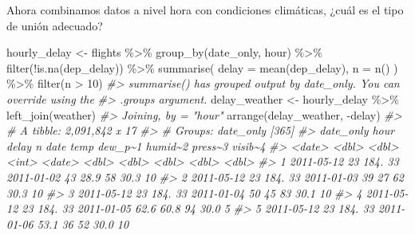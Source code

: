 \documentclass[
]{book}
\newenvironment{Shaded}{\begin{snugshade}}{\end{snugshade}}
\newcommand{\AttributeTok}[1]{\textcolor[rgb]{0.77,0.63,0.00}{#1}}
\newcommand{\CommentTok}[1]{\textcolor[rgb]{0.56,0.35,0.01}{\textit{#1}}}
\newcommand{\DecValTok}[1]{\textcolor[rgb]{0.00,0.00,0.81}{#1}}
\newcommand{\FunctionTok}[1]{\textcolor[rgb]{0.00,0.00,0.00}{#1}}
\newcommand{\NormalTok}[1]{#1}
\newcommand{\OtherTok}[1]{\textcolor[rgb]{0.56,0.35,0.01}{#1}}
\newcommand{\SpecialCharTok}[1]{\textcolor[rgb]{0.00,0.00,0.00}{#1}}
\begin{document}
Ahora combinamos datos a nivel hora con condiciones climáticas, ¿cuál es el tipo
de unión adecuado?

\begin{Shaded}
\begin{Highlighting}[]
\NormalTok{hourly\_delay }\OtherTok{\textless{}{-}}\NormalTok{ flights }\SpecialCharTok{\%\textgreater{}\%}
  \FunctionTok{group\_by}\NormalTok{(date\_only, hour) }\SpecialCharTok{\%\textgreater{}\%}
  \FunctionTok{filter}\NormalTok{(}\SpecialCharTok{!}\FunctionTok{is.na}\NormalTok{(dep\_delay)) }\SpecialCharTok{\%\textgreater{}\%}
  \FunctionTok{summarise}\NormalTok{(}
    \AttributeTok{delay =} \FunctionTok{mean}\NormalTok{(dep\_delay),}
    \AttributeTok{n =} \FunctionTok{n}\NormalTok{() ) }\SpecialCharTok{\%\textgreater{}\%}
  \FunctionTok{filter}\NormalTok{(n }\SpecialCharTok{\textgreater{}} \DecValTok{10}\NormalTok{)}
\CommentTok{\#\textgreater{} \textasciigrave{}summarise()\textasciigrave{} has grouped output by \textquotesingle{}date\_only\textquotesingle{}. You can override using the}
\CommentTok{\#\textgreater{} \textasciigrave{}.groups\textasciigrave{} argument.}
\NormalTok{delay\_weather }\OtherTok{\textless{}{-}}\NormalTok{ hourly\_delay }\SpecialCharTok{\%\textgreater{}\%} \FunctionTok{left\_join}\NormalTok{(weather)}
\CommentTok{\#\textgreater{} Joining, by = "hour"}
\FunctionTok{arrange}\NormalTok{(delay\_weather, }\SpecialCharTok{{-}}\NormalTok{delay)}
\CommentTok{\#\textgreater{} \# A tibble: 2,091,842 x 17}
\CommentTok{\#\textgreater{} \# Groups:   date\_only [365]}
\CommentTok{\#\textgreater{}    date\_only   hour delay     n date        temp dew\_p\textasciitilde{}1 humid\textasciitilde{}2 press\textasciitilde{}3 visib\textasciitilde{}4}
\CommentTok{\#\textgreater{}    \textless{}date\textgreater{}     \textless{}dbl\textgreater{} \textless{}dbl\textgreater{} \textless{}int\textgreater{} \textless{}date\textgreater{}     \textless{}dbl\textgreater{}   \textless{}dbl\textgreater{}   \textless{}dbl\textgreater{}   \textless{}dbl\textgreater{}   \textless{}dbl\textgreater{}}
\CommentTok{\#\textgreater{}  1 2011{-}05{-}12    23  184.    33 2011{-}01{-}02  43      28.9      58    30.3      10}
\CommentTok{\#\textgreater{}  2 2011{-}05{-}12    23  184.    33 2011{-}01{-}03  39      27        62    30.3      10}
\CommentTok{\#\textgreater{}  3 2011{-}05{-}12    23  184.    33 2011{-}01{-}04  50      45        83    30.1      10}
\CommentTok{\#\textgreater{}  4 2011{-}05{-}12    23  184.    33 2011{-}01{-}05  62.6    60.8      94    30.0       5}
\CommentTok{\#\textgreater{}  5 2011{-}05{-}12    23  184.    33 2011{-}01{-}06  53.1    36        52    30.0      10}

\end{Highlighting}
\end{Shaded}
\end{document}
